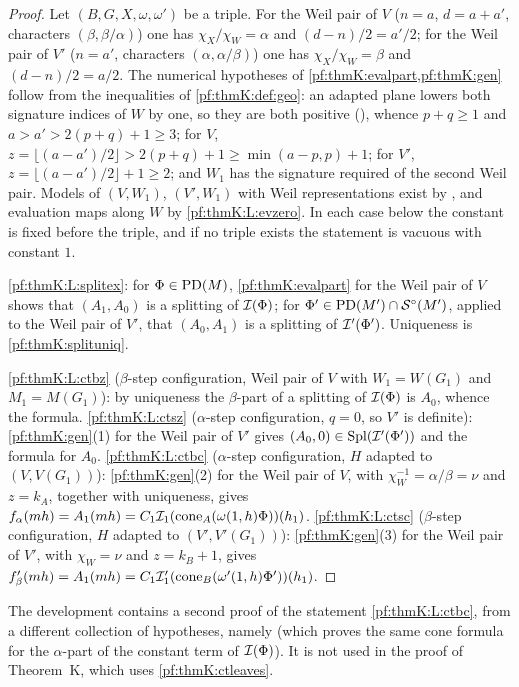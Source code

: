 \begin{proof}
Let $(B,G,X,\omega,\omega')$ be a triple. For the Weil pair of $V$ ($n=a$, $d=a+a'$, characters $(\beta,\beta/\alpha)$) one
has $\chi_X/\chi_W=\alpha$ and $(d-n)/2=a'/2$; for the Weil pair of $V'$ ($n=a'$, characters $(\alpha,\alpha/\beta)$) one has
$\chi_X/\chi_W=\beta$ and $(d-n)/2=a/2$. The numerical hypotheses of \cref{pf:thmK:evalpart,pf:thmK:gen} follow from the
inequalities of \cref{pf:thmK:def:geo}: an adapted plane lowers both signature indices of $W$ by one, so they are both
positive (), whence $p+q\ge1$ and $a>a'>2(p+q)+1\ge3$; for $V$,
$z=\lfloor(a-a')/2\rfloor>2(p+q)+1\ge\min(a-p,p)+1$; for $V'$, $z=\lfloor(a-a')/2\rfloor+1\ge2$; and $W_1$ has the signature
required of the second Weil pair. Models of $(V,W_1)$, $(V',W_1)$ with Weil
representations exist by , and evaluation maps along $W$ by
\ref{pf:thmK:L:evzero}. In each case below the constant is fixed before the triple, and if no triple exists the statement
is vacuous with constant $1$.

\ref{pf:thmK:L:splitex}: for $\Phi\in\operatorname{PD}(M)$, \cref{pf:thmK:evalpart} for the Weil pair of $V$ shows that $(A_1,A_0)$ is a
splitting of $\mathcal{I}(\Phi)$; for $\Phi'\in\operatorname{PD}(M')\cap\mathcal{S}^{\circ}(M')$, applied to the Weil pair of $V'$, that $(A_0,A_1)$ is a
splitting of $\mathcal{I}'(\Phi')$. Uniqueness is \cref{pf:thmK:splituniq}.

\ref{pf:thmK:L:ctbz} ($\beta$-step configuration, Weil pair of $V$ with $W_1=W(G_1)$ and $M_1=M(G_1)$): by uniqueness the
$\beta$-part of a splitting of $\mathcal{I}(\Phi)$ is $A_0$, whence the formula.
\ref{pf:thmK:L:ctsz} ($\alpha$-step configuration, $q=0$, so $V'$ is definite): \cref{pf:thmK:gen}(1) for the Weil pair of $V'$
gives $(A_0,0)\in\operatorname{Spl}(\mathcal{I}'(\Phi'))$ and the formula for $A_0$.
\ref{pf:thmK:L:ctbc} ($\alpha$-step configuration, $H$ adapted to $(V,V(G_1))$): \cref{pf:thmK:gen}(2) for the Weil pair of
$V$, with $\chi_W^{-1}=\alpha/\beta=\nu$ and $z=k_A$, together with uniqueness, gives
$f_\alpha(mh)=A_1(mh)=C_1\mathcal{I}_1(\operatorname{cone}_A(\omega(1,h)\Phi))(h_1)$.
\ref{pf:thmK:L:ctsc} ($\beta$-step configuration, $H$ adapted to $(V',V'(G_1))$): \cref{pf:thmK:gen}(3) for the Weil pair of
$V'$, with $\chi_W=\nu$ and $z=k_B+1$, gives $f'_\beta(mh)=A_1(mh)=C_1\mathcal{I}'_1(\operatorname{cone}_B(\omega'(1,h)\Phi'))(h_1)$.
\end{proof}

\begin{remark}\label{pf:thmK:rem:ctcone}
The development contains a second proof of the statement \ref{pf:thmK:L:ctbc}, from a different collection of hypotheses,
namely  (which proves the same cone formula for the $\alpha$-part of the constant term
of $\mathcal{I}(\Phi)$). It is not used in the proof of Theorem~K, which uses \cref{pf:thmK:ctleaves}.
\end{remark}

